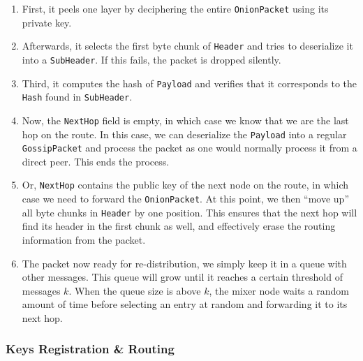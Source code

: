 \documentclass[11pt, a4paper]{article}
\begin{document}
            \begin{enumerate}
                \item First, it peels one layer by deciphering the entire \texttt{OnionPacket} using its private key.

                \item Afterwards, it selects the first byte chunk of \texttt{Header} and tries to deserialize it into a \texttt{SubHeader}. If this fails, the packet is dropped silently.

                \item Third, it computes the hash of \texttt{Payload} and verifies that it corresponds to the \texttt{Hash} found in \texttt{SubHeader}.

                \item Now,  the \texttt{NextHop} field is empty, in which case we know that we are the last hop on the route.
                In this case, we can deserialize the \texttt{Payload} into a regular \texttt{GossipPacket} and process the packet as one would normally process it from a direct peer. This ends the process.
                \item Or, \texttt{NextHop} contains the public key of the next node on the route, in which case we need to forward the \texttt{OnionPacket}.
                At this point, we then ``move up'' all byte chunks in \texttt{Header} by one position.
                This ensures that the next hop will find its header in the first chunk as well, and effectively erase the routing information from the packet.
                \item The packet now ready for re-distribution, we simply keep it in a queue with other messages.
                This queue will grow until it reaches a certain threshold of messages $k$.
                When the queue size is above $k$, the mixer node waits a random amount of time before selecting an entry at random and forwarding it to its next hop.

            \end{enumerate}



        \subsubsection{Keys Registration \& Routing}
\end{document}
